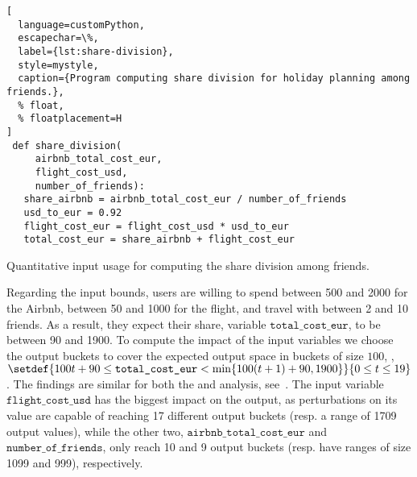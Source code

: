\begin{lstlisting}[
  language=customPython,
  escapechar=\%,
  label={lst:share-division},
  style=mystyle,
  caption={Program computing share division for holiday planning among friends.},
  % float,
  % floatplacement=H
]
 def share_division(
     airbnb_total_cost_eur,
     flight_cost_usd,
     number_of_friends):
   share_airbnb = airbnb_total_cost_eur / number_of_friends
   usd_to_eur = 0.92
   flight_cost_eur = flight_cost_usd * usd_to_eur
   total_cost_eur = share_airbnb + flight_cost_eur
\end{lstlisting}
%
\begin{margintable}
  \caption{Quantitative input usage for  computing the share division among friends.}
  \centering
\end{margintable}
Regarding the input bounds, users are willing to spend between 500 and 2000 for the Airbnb, between 50 and 1000 for the flight, and travel with between 2 and 10 friends. As a result, they expect their share, variable $\texttt{total\_cost\_eur}$, to be between 90 and 1900.
To compute the impact of the input variables we choose the output buckets to cover the expected output space in buckets of size $100$, \ie, $\setdef{100t + 90 \le \texttt{total\_cost\_eur} < \min \{100(t + 1) + 90, 1900\}}{0 \le t \le 19}$.
The %
findings are similar for both the \abstractoutcomesname{} and \abstractrangename{} analysis, see~.
The input variable $\texttt{flight\_cost\_usd}$ has the biggest impact on the output, as perturbations on its value are capable of reaching 17 different output buckets (resp. a range of 1709 output values), while the other two, $\texttt{airbnb\_total\_cost\_eur}$ and $\texttt{number\_of\_friends}$, only reach 10 and 9 output buckets (resp. have ranges of size 1099 and 999), respectively.


